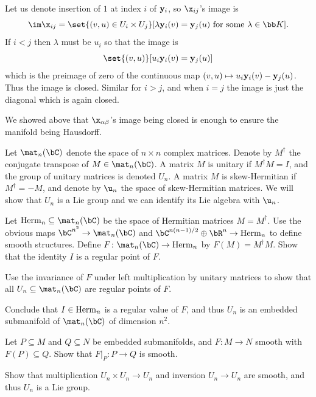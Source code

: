     Let us denote insertion of $1$ at index $i$ of ${\bf y}_i$, so $\x_{ij}$'s image is
    $$ \im\x_{ij} = \set{(v,u)\in U_i\times U_j}[\lambda\y_i(v)=\y_j(u)\hbox{ for some $\lambda\in\bK$}] . $$
    If $i<j$ then $\lambda$ must be $u_i$ so that the image is
    $$ \set{(v,u)}[u_i\y_i(v)=\y_j(u)] $$
    which is the preimage of zero of the continuous map $(v,u)\mapsto u_i{\bf y}_i(v)-{\bf y}_j(u)$.
    Thus the image is closed.
    Similar for $i>j$, and when $i=j$ the image is just the diagonal which is again closed.

    We showed above that $\x_{\alpha\beta}$'s image being closed is enough to ensure the manifold being Hausdorff.
\eenum

\def\herm{{\rm Herm}}
\bprob

    Let $\mat_n(\bC)$ denote the space of $n\times n$ complex matrices.
    Denote by $M^\dagger$ the conjugate transpose of $M\in\mat_n(\bC)$.
    A matrix $M$ is {\emphcolor unitary} if $M^\dagger M=I$, and the group of unitary matrices is denoted $U_n$.
    A matrix $M$ is {\emphcolor skew-Hermitian} if $M^\dagger=-M$, and denote by $\u_n$ the space of skew-Hermitian matrices.
    We will show that $U_n$ is a Lie group and we can identify its Lie algebra with $\u_n$.

    \benum
        \item Let $\herm_n\subseteq\mat_n(\bC)$ be the space of Hermitian matrices $M=M^\dagger$.
        Use the obvious maps $\bC^{n^2}\to\mat_n(\bC)$ and $\bC^{n(n-1)/2}\oplus\bR^n\to\herm_n$ to define smooth structures.
        Define $F\colon\mat_n(\bC)\to\herm_n$ by $F(M)=M^\dagger M$.
        Show that the identity $I$ is a regular point of $F$.

        \item Use the invariance of $F$ under left multiplication by unitary matrices to show that all $U_n\subseteq\mat_n(\bC)$ are regular points
        of $F$.

        \item Conclude that $I\in\herm_n$ is a regular value of $F$, and thus $U_n$ is an embedded submanifold of $\mat_n(\bC)$ of dimension $n^2$.

        \item Let $P\subseteq M$ and $Q\subseteq N$ be embedded submanifolds, and $F\colon M\to N$ smooth with $F(P)\subseteq Q$.
        Show that $F|_P\colon P\to Q$ is smooth.

        \item Show that multiplication $U_n\times U_n\to U_n$ and inversion $U_n\to U_n$ are smooth, and thus $U_n$ is a Lie group.

